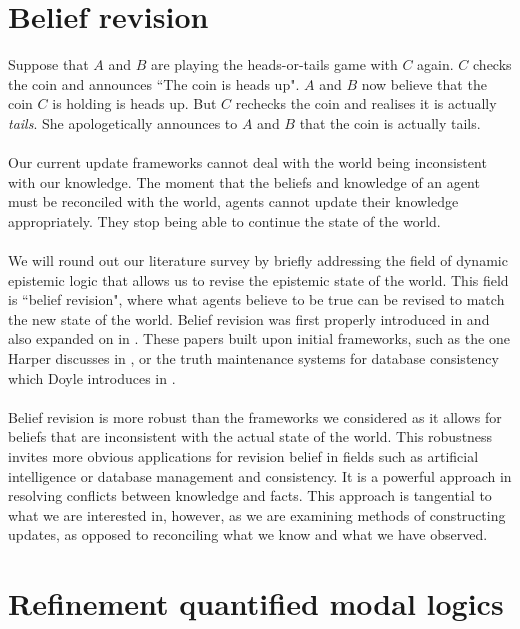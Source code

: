 \section{Belief revision}

Suppose that $A$ and $B$ are playing the heads-or-tails game with $C$ again.
$C$ checks the coin and announces ``The coin is heads up".
$A$ and $B$ now believe that the coin $C$ is holding is heads up.
But $C$ rechecks the coin and realises it is actually {\em tails}.
She apologetically announces to $A$ and $B$ that the coin is actually tails.\\
\\
Our current update frameworks cannot deal with the world being inconsistent with
our knowledge.
The moment that the beliefs and knowledge of an agent must be reconciled with
the world, agents cannot update their knowledge appropriately.
They stop being able to continue the state of the world.\\
\\
We will round out our literature survey by briefly addressing the field of
dynamic epistemic logic that allows us to revise the epistemic state of the
world.
This field is ``belief revision", where what agents believe to be true can be
revised to match the new state of the world.
Belief revision was first properly introduced in \cite{theLogicOfTheoryChange} and also
expanded on in \cite{gairdenfors1988knowledge}.
These papers built upon initial frameworks, such as the one Harper discusses in
\cite{harper1976rational}, or the truth maintenance systems for database
consistency which Doyle introduces in \cite{Doyle1979231}.\\
\\
Belief revision is more robust than the frameworks we considered as it allows
for beliefs that are inconsistent with the actual state of the world.
This robustness invites more obvious applications for revision belief in fields such as
artificial intelligence or database management and consistency.
It is a powerful approach in resolving conflicts between knowledge and facts.
This approach is tangential to what we are interested in, however, as we are
examining methods of constructing updates, as opposed to reconciling what we
know and what we have observed.

\section{Refinement quantified modal logics} \label{section:refineModalLogics}

